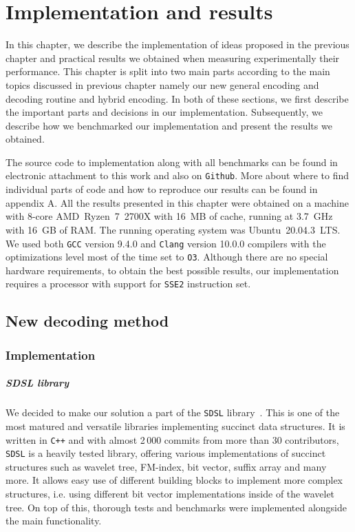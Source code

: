\chapter{Implementation and results}
\label{kap:kap4}

In this chapter, we describe the implementation of ideas proposed in the previous
chapter and practical results we obtained when measuring experimentally their performance.
This chapter is split into two main parts according to the main topics discussed
in previous chapter namely our new general encoding and decoding routine and hybrid encoding.
In both of these sections, we first describe the important parts and decisions in our
implementation. Subsequently, we describe how we benchmarked our implementation and present
the results we obtained.

The source code to implementation along with all benchmarks can be found in electronic
attachment to this work and also on \texttt{Github}. More about where to find individual
parts of code and how to reproduce our results can be found in appendix A. All the results
presented in this chapter were obtained on a machine with 8-core AMD~Ryzen~7~2700X with
16~MB of cache, running at 3.7~GHz with 16~GB of RAM. The running operating system was
Ubuntu~20.04.3~LTS. We used both \texttt{GCC} version 9.4.0 and \texttt{Clang} version
10.0.0 compilers with the optimizations level most of the time set to \texttt{O3}.
Although there are no special hardware requirements, to obtain the best possible results,
our implementation requires a processor with support for \texttt{SSE2} instruction set.

\section{New decoding method}

\subsection{Implementation}

\paragraph{SDSL library}

We decided to make our solution a part of the \texttt{SDSL} library~\citep{gog2014theory}. This
is one of the most matured and versatile libraries implementing succinct data structures. It is
written in \texttt{C++} and with almost 2\,000 commits from more than 30 contributors, \texttt{SDSL}
is a heavily tested library, offering various implementations of succinct structures such as
wavelet tree, FM-index, bit vector, suffix array and many more. It allows easy use of different
building blocks to implement more complex structures, i.e. using different bit vector implementations
inside of the wavelet tree. On top of this, thorough tests and benchmarks were implemented alongside
the main functionality.

